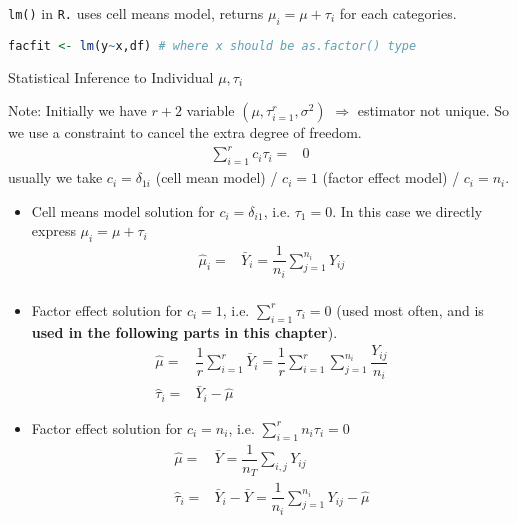 \begin{rcode}
    \lstinline|lm()| in \lstinline|R.| uses cell means model, returns $ \mu_i=\mu +\tau_i $ for each categories.
\begin{lstlisting}[language=R]
facfit <- lm(y~x,df) # where x should be as.factor() type
\end{lstlisting}
\end{rcode}    

\begin{point}
    Statistical Inference to Individual $ \mu ,\tau_i $
\end{point}

    Note: Initially we have $r+2$ variable $ (\mu ,\tau_{i=1}^r,\sigma ^2) $ $\Rightarrow $ estimator not unique. So we use a constraint to cancel the extra degree of freedom.
\begin{align}
    \sum_{i=1}^rc_i\tau_i=&0
\end{align}
    usually we take $ c_i=\delta _{1i} $ (cell mean model) / $ c_i=1 $ (factor effect model) / $ c_i=n_i $.

\begin{itemize}[topsep=2pt,itemsep=0pt]
    \item Cell means model solution for $ c_i=\delta _{i1} $, i.e. $ \tau_1=0 $. In this case we directly express $ \mu _i=\mu +\tau_i $
    \begin{align*}
        \hat{\mu }_i=&\bar{Y}_i=\dfrac{1}{n_i}\sum_{j=1}^{n_i}Y_{ij}\\ 
    \end{align*}
    \item Factor effect solution for $ c_i=1 $, i.e. $ \sum_{i=1}^r \tau _i=0 $ (used most often, and is \textbf{used in the following parts in this chapter}).
\begin{align}
    \hat{\mu }=&\dfrac{1}{r}\sum_{i=1}^r\bar{Y}_i=\dfrac{1}{r}\sum_{i=1}^r\sum_{j=1}^{n_i}\dfrac{Y_{ij}}{n_i}\\
    \hat{\tau}_i=&\bar{Y}_i-\hat{\mu }
\end{align}
    \item Factor effect solution for $ c_i=n_i $, i.e. $ \sum_{i=1}^r n_i\tau _i=0 $
\begin{align}
    \hat{\mu }=&\bar{Y}=\dfrac{1}{n_T}\sum_{i,j}Y_{ij}\\
    \hat{\tau}_i=&\bar{Y}_i-\bar{Y}=\dfrac{1}{n_i}\sum_{j=1}^{n_i}Y_{ij}-\hat{\mu}
\end{align}

\end{itemize}

